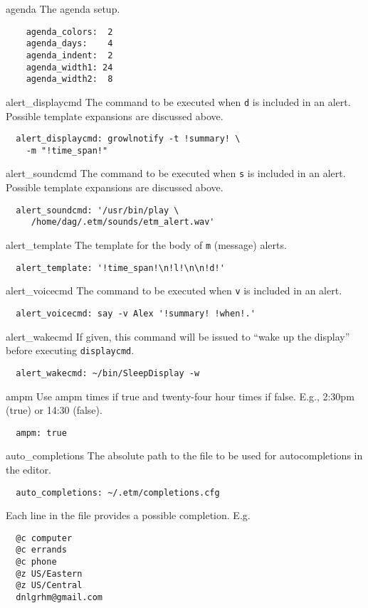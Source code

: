 \documentclass[9pt,landscape]{article}
\begin{document}
\begin{multicols}{3}
\begin{compactdesc}
\item[agenda] The agenda setup.
\begin{verbatim}
    agenda_colors:  2
    agenda_days:    4
    agenda_indent:  2
    agenda_width1: 24
    agenda_width2:  8
\end{verbatim}

\item[alert\_displaycmd] The command to be executed when \verb'd' is included in an alert. Possible template expansions are discussed above.
\begin{verbatim}
  alert_displaycmd: growlnotify -t !summary! \
    -m "!time_span!"
\end{verbatim}

\item[alert\_soundcmd] The command to be executed when \verb's' is included in an alert. Possible template expansions are discussed above.
\begin{verbatim}
  alert_soundcmd: '/usr/bin/play \
     /home/dag/.etm/sounds/etm_alert.wav'
\end{verbatim}

\item[alert\_template] The template for the body of \verb'm' (message) alerts.
\begin{verbatim}
  alert_template: '!time_span!\n!l!\n\n!d!'
\end{verbatim}

\item[alert\_voicecmd] The command to be executed when \verb'v' is included in an alert.
\begin{verbatim}
  alert_voicecmd: say -v Alex '!summary! !when!.'
\end{verbatim}

\item[alert\_wakecmd] If given, this command will be issued to ``wake up the display'' before executing \verb'displaycmd'.
\begin{verbatim}
  alert_wakecmd: ~/bin/SleepDisplay -w
\end{verbatim}

\item[ampm] Use ampm times if true and twenty-four hour times if false. E.g., 2:30pm (true) or 14:30 (false).
\begin{verbatim}
  ampm: true
\end{verbatim}

\item[auto\_completions] The absolute path to the file to be used for autocompletions in the editor.
\begin{verbatim}
  auto_completions: ~/.etm/completions.cfg
\end{verbatim}
Each line in the file provides a possible completion. E.g.
\begin{verbatim}
  @c computer
  @c errands
  @c phone
  @z US/Eastern
  @z US/Central
  dnlgrhm@gmail.com
\end{verbatim}


\end{compactdesc}
\end{multicols}
\end{document}
